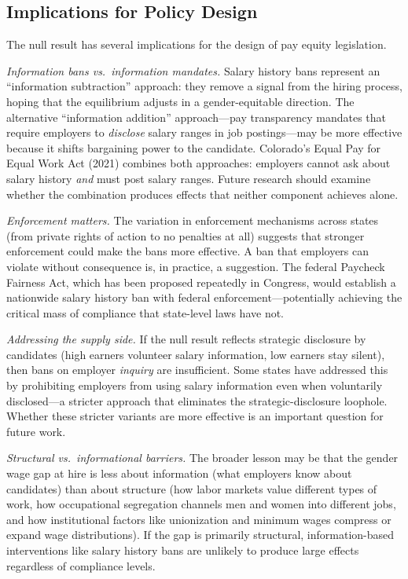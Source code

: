 \documentclass[12pt]{article}
\begin{document}
\subsection{Implications for Policy Design}

The null result has several implications for the design of pay equity legislation.

\textit{Information bans vs.\ information mandates.} Salary history bans represent an ``information subtraction'' approach: they remove a signal from the hiring process, hoping that the equilibrium adjusts in a gender-equitable direction. The alternative ``information addition'' approach---pay transparency mandates that require employers to \textit{disclose} salary ranges in job postings---may be more effective because it shifts bargaining power to the candidate. Colorado's Equal Pay for Equal Work Act (2021) combines both approaches: employers cannot ask about salary history \textit{and} must post salary ranges. Future research should examine whether the combination produces effects that neither component achieves alone.

\textit{Enforcement matters.} The variation in enforcement mechanisms across states (from private rights of action to no penalties at all) suggests that stronger enforcement could make the bans more effective. A ban that employers can violate without consequence is, in practice, a suggestion. The federal Paycheck Fairness Act, which has been proposed repeatedly in Congress, would establish a nationwide salary history ban with federal enforcement---potentially achieving the critical mass of compliance that state-level laws have not.

\textit{Addressing the supply side.} If the null result reflects strategic disclosure by candidates (high earners volunteer salary information, low earners stay silent), then bans on employer \textit{inquiry} are insufficient. Some states have addressed this by prohibiting employers from using salary information even when voluntarily disclosed---a stricter approach that eliminates the strategic-disclosure loophole. Whether these stricter variants are more effective is an important question for future work.

\textit{Structural vs.\ informational barriers.} The broader lesson may be that the gender wage gap at hire is less about information (what employers know about candidates) than about structure (how labor markets value different types of work, how occupational segregation channels men and women into different jobs, and how institutional factors like unionization and minimum wages compress or expand wage distributions). If the gap is primarily structural, information-based interventions like salary history bans are unlikely to produce large effects regardless of compliance levels.
\end{document}
